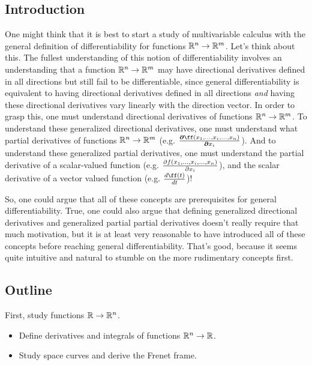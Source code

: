 \subsection*{Introduction}

One might think that it is best to start a study of multivariable calculus with the general definition of differentiability for functions $\mathbb{R}^n \rightarrow \mathbb{R}^m$. Let's think about this. The fullest understanding of this notion of differentiability involves an understanding that a function $\mathbb{R}^n \rightarrow \mathbb{R}^m$ may have directional derivatives defined in all directions but still fail to be differentiable, since general differentiability is equivalent to having directional derivatives defined in all directions \textit{and} having these directional derivatives vary linearly with the direction vector. In order to grasp this, one must understand directional derivatives of functions $\mathbb{R}^n \rightarrow \mathbb{R}^m$. To understand these generalized directional derivatives, one must understand what partial derivatives of functions $\mathbb{R}^n \rightarrow \mathbb{R}^m$ (e.g. $\frac{\boldsymbol{\pd} \ff(x_1, ..., x_i, ..., x_n)}{\boldsymbol{\pd} x_i}$). And to understand these generalized partial derivatives, one must understand the partial derivative of a scalar-valued function (e.g. $\frac{\partial f(x_1, ..., x_i, ..., x_n)}{\partial x_i}$), and the scalar derivative of a vector valued function (e.g. $\frac{d\ff(t)}{dt}$)!

So, one could argue that all of these concepts are prerequisites for general differentiability. True, one could also argue that defining generalized directional derivatives and generalized partial partial derivatives doesn't really require that much motivation, but it is at least very reasonable to have introduced all of these concepts before reaching general differentiability. That's good, because it seems quite intuitive and natural to stumble on the more rudimentary concepts first.

\subsection*{Outline}

First, study functions $\mathbb{R} \rightarrow \mathbb{R}^n$.

\begin{itemize}
    \item Define derivatives and integrals of functions $\mathbb{R}^n \rightarrow \mathbb{R}$. 
    \item Study space curves and derive the Frenet frame.
\end{itemize}


